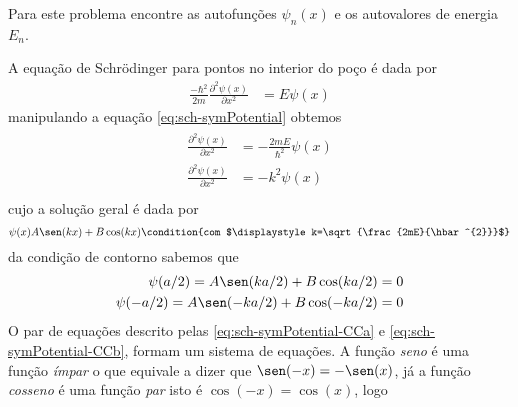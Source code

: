 \begin{prob}
\begin{center}
	\end{center}
	Para este problema encontre as autofunções $\psi_{n}(x)$ e os autovalores de energia $E_{n}$.
	\begin{sol}
		A equação de Schrödinger para pontos no interior do poço é dada por
		\begin{align}
			\frac{-\hbar^{2}}{2m}\frac{\partial^{2} \psi(x)}{\partial x^{2}} &= E \psi(x)
			\label{eq:sch-symPotential}
		\end{align}
		manipulando a equação \eqref{eq:sch-symPotential} obtemos
		\begin{align}
			\begin{split}
				\frac{\partial^{2} \psi(x)}{\partial x^{2}} &= -\frac{2mE}{\hbar^{2}} \psi(x)\\
				\frac{\partial^{2} \psi(x)}{\partial x^{2}} &= -k^{2} \psi(x)\\
			\end{split}
		\end{align}
		cujo a solução geral é dada por
		\begin{dmath*}
			\psi(x)A\sen(kx)+B\cos(kx)\condition{com $\displaystyle k=\sqrt{\frac{2mE}{\hbar^{2}}}$}
		\end{dmath*}
		da condição de contorno sabemos que
		\begin{subequations}
			\begin{align}
				\psi(a/2)=A\sen(ka/2)+B\cos(ka/2) &=0 \label{eq:sch-symPotential-CCa}\\
				\psi(-a/2)=A\sen(-ka/2)+B\cos(-ka/2) &= 0\label{eq:sch-symPotential-CCb}
			\end{align}
		\end{subequations}
		O par de equações descrito pelas \eqref{eq:sch-symPotential-CCa} e \eqref{eq:sch-symPotential-CCb}, formam um sistema de equações. A função \textit{seno} é uma função \textit{ímpar} o que equivale a dizer que $\sen(-x)=-\sen(x)$, já a função \textit{cosseno} é uma função \textit{par} isto é $\cos(-x)=\cos(x)$, logo
		\begin{align}

\end{align}
\end{sol}
\end{prob}
